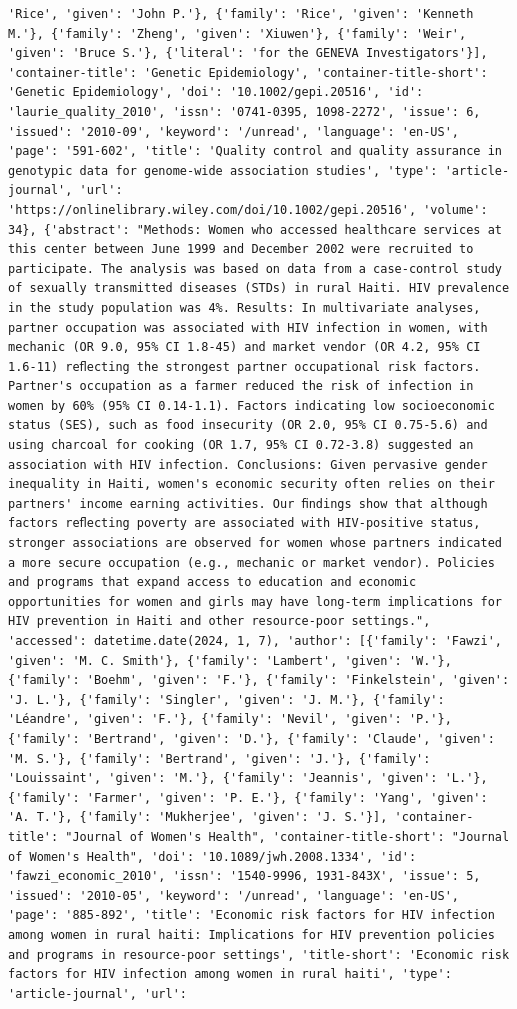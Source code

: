 \documentclass[
  12pt,
]
{article}
\begin{document}
\begin{verbatim}
'Rice', 'given': 'John P.'}, {'family': 'Rice', 'given': 'Kenneth M.'}, {'family': 'Zheng', 'given': 'Xiuwen'}, {'family': 'Weir', 'given': 'Bruce S.'}, {'literal': 'for the GENEVA Investigators'}], 'container-title': 'Genetic Epidemiology', 'container-title-short': 'Genetic Epidemiology', 'doi': '10.1002/gepi.20516', 'id': 'laurie_quality_2010', 'issn': '0741-0395, 1098-2272', 'issue': 6, 'issued': '2010-09', 'keyword': '/unread', 'language': 'en-US', 'page': '591-602', 'title': 'Quality control and quality assurance in genotypic data for genome‐wide association studies', 'type': 'article-journal', 'url': 'https://onlinelibrary.wiley.com/doi/10.1002/gepi.20516', 'volume': 34}, {'abstract': "Methods: Women who accessed healthcare services at this center between June 1999 and December 2002 were recruited to participate. The analysis was based on data from a case-control study of sexually transmitted diseases (STDs) in rural Haiti. HIV prevalence in the study population was 4%. Results: In multivariate analyses, partner occupation was associated with HIV infection in women, with mechanic (OR 9.0, 95% CI 1.8-45) and market vendor (OR 4.2, 95% CI 1.6-11) reﬂecting the strongest partner occupational risk factors. Partner's occupation as a farmer reduced the risk of infection in women by 60% (95% CI 0.14-1.1). Factors indicating low socioeconomic status (SES), such as food insecurity (OR 2.0, 95% CI 0.75-5.6) and using charcoal for cooking (OR 1.7, 95% CI 0.72-3.8) suggested an association with HIV infection. Conclusions: Given pervasive gender inequality in Haiti, women's economic security often relies on their partners' income earning activities. Our ﬁndings show that although factors reﬂecting poverty are associated with HIV-positive status, stronger associations are observed for women whose partners indicated a more secure occupation (e.g., mechanic or market vendor). Policies and programs that expand access to education and economic opportunities for women and girls may have long-term implications for HIV prevention in Haiti and other resource-poor settings.", 'accessed': datetime.date(2024, 1, 7), 'author': [{'family': 'Fawzi', 'given': 'M. C. Smith'}, {'family': 'Lambert', 'given': 'W.'}, {'family': 'Boehm', 'given': 'F.'}, {'family': 'Finkelstein', 'given': 'J. L.'}, {'family': 'Singler', 'given': 'J. M.'}, {'family': 'Léandre', 'given': 'F.'}, {'family': 'Nevil', 'given': 'P.'}, {'family': 'Bertrand', 'given': 'D.'}, {'family': 'Claude', 'given': 'M. S.'}, {'family': 'Bertrand', 'given': 'J.'}, {'family': 'Louissaint', 'given': 'M.'}, {'family': 'Jeannis', 'given': 'L.'}, {'family': 'Farmer', 'given': 'P. E.'}, {'family': 'Yang', 'given': 'A. T.'}, {'family': 'Mukherjee', 'given': 'J. S.'}], 'container-title': "Journal of Women's Health", 'container-title-short': "Journal of Women's Health", 'doi': '10.1089/jwh.2008.1334', 'id': 'fawzi_economic_2010', 'issn': '1540-9996, 1931-843X', 'issue': 5, 'issued': '2010-05', 'keyword': '/unread', 'language': 'en-US', 'page': '885-892', 'title': 'Economic risk factors for HIV infection among women in rural haiti: Implications for HIV prevention policies and programs in resource-poor settings', 'title-short': 'Economic risk factors for HIV infection among women in rural haiti', 'type': 'article-journal', 'url': 
\end{verbatim}
\end{document}
